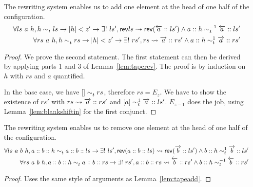 \documentclass[a4paper,UKenglish,cleveref, autoref]{lipics-v2019}
\newcommand{\TODO}[1]{\ifthenelse{\isundefined{\showTODOs}}{}{\colorbox{red}{\LARGE TODO}:#1}}
\newcommand{\strent}{\rightsquigarrow}
\begin{document}
\begin{lemma}\label{lem:tapeadd}
  The rewriting system enables us to add one element at the head of one half of the configuration.
  \begin{align*}
    \forall ls~a~h, h \reprt{} ls \rightarrow \length{h} < z' \rightarrow \exists!~ls', \rev{ls} \strent{} \rev{(\polneg{a} :: ls')} \land a :: h \reprt{-1} \polneg{a} :: ls' \\
    \forall rs~a~h, h \reprt{} rs \rightarrow \length{h} < z' \rightarrow \exists!~rs', rs \strent{} \polpos{a} :: rs' \land a :: h \reprt{1} \polpos{a} :: rs'
  \end{align*}
\end{lemma}
\begin{proof}
  We prove the second statement. The first statement can then be derived by applying parts 1 and 3 of Lemma~\ref{lem:taperev}. 
  The proof is by induction on $h$ with $rs$ and $a$ quantified. 

  In the base case, we have $[] \sim_t^{} rs$, therefore $rs = E_z$. We have to show the existence of $rs'$ with $rs \strent{} \polpos{a} :: rs'$ and $[a] \sim_t^{1} \overrightarrow{a} :: ls'$. $E_{z-1}$ does the job, using Lemma~\ref{lem:blankshiftin} for the first conjunct. 

  \TODO{} 
\end{proof}
\begin{lemma}\label{lem:taperem}
  The rewriting system enables us to remove one element at the head of one half of the configuration.
  \begin{align*}
    \forall ls~a~b~h, a::b::h \reprt{} a::b::ls \rightarrow \exists!~ls', \rev{(a :: b :: ls)} \strent{} \rev{(\polpos{b} :: ls')} \land b :: h \reprt{1} \polpos{b} :: ls' \\
    \forall rs~a~b~h, a :: b :: h \reprt{} a :: b :: rs \rightarrow \exists!~rs', a :: b :: rs \strent{} \polneg{b} :: rs' \land b :: h \reprt{-1} \polneg{b} :: rs'
  \end{align*}
\end{lemma}
\begin{proof}
  Uses the same style of arguments as Lemma~\ref{lem:tapeadd}.
\end{proof}
\end{document}
